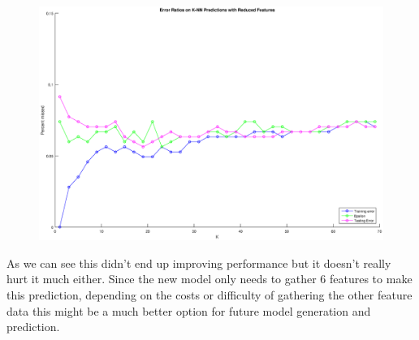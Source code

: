 \documentclass{article}
\begin{document}
	\begin{figure}[h!]
		\begin{center} 
			\includegraphics[scale=0.4]{reduced.eps} 
		\end{center}  
		\label{fig:M3}
	\end{figure}

As we can see this didn't end up improving performance but it doesn't really hurt it much either. Since the new model only needs to gather 6 features to make this prediction, depending on the costs or difficulty of gathering the other feature data this might be a much better option for future model generation and prediction.

\newpage


	
	
\end{document}
